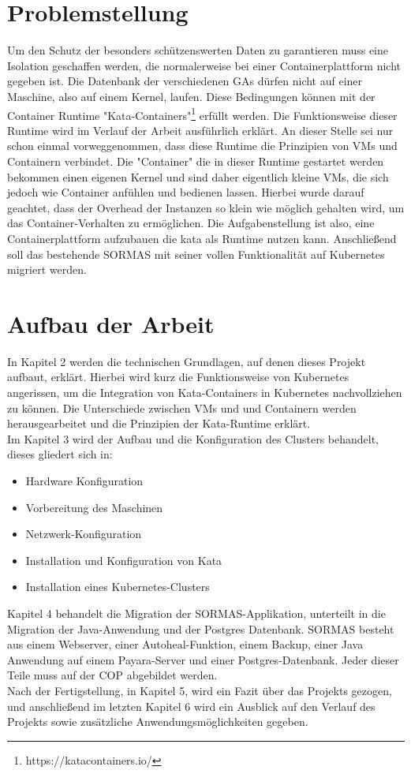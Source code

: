 \section{Problemstellung}
Um den Schutz der besonders schützenswerten Daten zu garantieren muss eine Isolation geschaffen werden, die normalerweise bei einer Containerplattform nicht gegeben ist. 
Die Datenbank der verschiedenen \ac{GAs} dürfen nicht auf einer Maschine, also auf einem Kernel, laufen.
Diese Bedingungen können mit der Container Runtime "Kata-Containers"\footnote{https://katacontainers.io/} erfüllt werden. 
Die Funktionsweise dieser Runtime wird im Verlauf der Arbeit ausführlich erklärt. 
An dieser Stelle sei nur schon einmal vorweggenommen, dass diese Runtime die Prinzipien von \ac{VM}s und Containern  verbindet. 
Die "Container" die in dieser Runtime gestartet werden bekommen einen eigenen Kernel und sind daher eigentlich kleine \ac{VM}s, die sich jedoch wie Container anfühlen und bedienen lassen.
Hierbei wurde darauf geachtet, dass der Overhead der Instanzen so klein wie möglich gehalten wird, um das Container-Verhalten zu ermöglichen.
Die Aufgabenstellung ist also, eine Containerplattform aufzubauen die kata als Runtime nutzen kann.
Anschließend soll das bestehende \ac{SORMAS} mit seiner vollen Funktionalität auf Kubernetes migriert werden.

\section{Aufbau der Arbeit}
In Kapitel 2 werden die technischen Grundlagen, auf denen dieses Projekt aufbaut, erklärt. 
Hierbei wird kurz die Funktionsweise von Kubernetes angerissen, um die Integration von Kata-Containers in Kubernetes nachvollziehen zu können.
Die Unterschiede zwischen \ac{VM}s und und Containern werden herausgearbeitet und die Prinzipien der Kata-Runtime erklärt.
\\
Im Kapitel 3 wird der Aufbau und die Konfiguration des Clusters behandelt, dieses gliedert sich in:
\begin{itemize}
    \item Hardware Konfiguration
    \item Vorbereitung des Maschinen
    \item Netzwerk-Konfiguration
    \item Installation und Konfiguration von Kata
    \item Installation eines Kubernetes-Clusters
\end{itemize}

Kapitel 4 behandelt die Migration der \ac{SORMAS}-Applikation, unterteilt in die Migration der Java-Anwendung und der Postgres Datenbank.
\ac{SORMAS} besteht aus einem Webserver, einer Autoheal-Funktion, einem Backup, einer Java Anwendung auf einem Payara-Server und einer Postgres-Datenbank.
Jeder dieser Teile muss auf der \ac{COP} abgebildet werden.
\\
Nach der Fertigstellung, in Kapitel 5, wird ein Fazit über das Projekts gezogen, und anschließend im letzten Kapitel 6 wird ein Ausblick auf den Verlauf des Projekts sowie zusätzliche Anwendungsmöglichkeiten gegeben.
